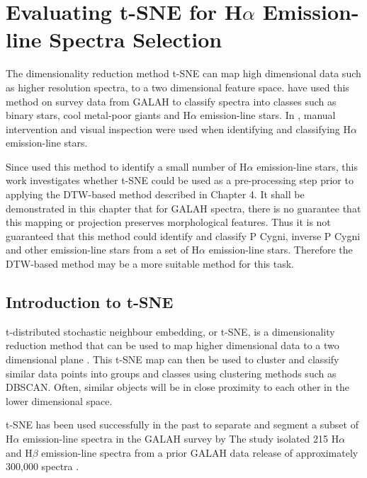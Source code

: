 \chapter{Evaluating t-SNE for H$\alpha$ Emission-line Spectra Selection}

The dimensionality reduction method t-SNE can map high dimensional data such as higher resolution spectra, to a two dimensional feature space. \citet{traven2017galah} have used this method on survey data from GALAH to classify spectra into classes such as binary stars, cool metal-poor giants and H$\alpha$ emission-line stars. In \citet{traven2017galah}, manual intervention and visual inspection were used when identifying and classifying H$\alpha$ emission-line stars.

Since \citet{traven2017galah} used this method to identify a small number of H$\alpha$ emission-line stars, this work investigates whether t-SNE could be used as a pre-processing step prior to applying the DTW-based method described in Chapter 4. It shall be demonstrated in this chapter that for GALAH spectra, there is no guarantee that this mapping or projection preserves morphological features. Thus it is not guaranteed that this method could identify and classify P Cygni, inverse P Cygni and other emission-line stars from a set of H$\alpha$ emission-line stars. Therefore the DTW-based method may be a more suitable method for this task.

\section{Introduction to t-SNE}

t-distributed stochastic neighbour embedding, or t-SNE, is a dimensionality reduction method that can be used to map higher dimensional data to a two dimensional plane \citep{van2008visualizing} . This t-SNE map can then be used to cluster and classify similar data points into groups and classes using clustering methods such as DBSCAN. Often, similar objects will be in close proximity to each other in the lower dimensional space.

t-SNE has been used successfully in the past to separate and segment a subset of H$\alpha$ emission-line spectra in the GALAH survey by \citet{traven2017galah} The study isolated 215 H$\alpha$ and H$\beta$ emission-line spectra from a prior GALAH data release of approximately 300,000 spectra \citep{traven2017galah}.

